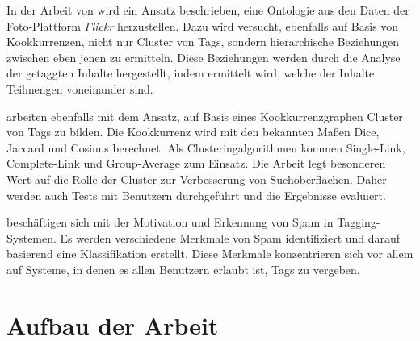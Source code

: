 In der Arbeit von \textcite{ps2006} wird ein Ansatz beschrieben, eine Ontologie aus den Daten der Foto-Plattform \emph{Flickr} herzustellen. Dazu wird versucht, ebenfalls auf Basis von Kookkurrenzen, nicht nur Cluster von Tags, sondern hierarchische Beziehungen zwischen eben jenen zu ermitteln. Diese Beziehungen werden durch die Analyse der getaggten Inhalte hergestellt, indem ermittelt wird, welche der Inhalte Teilmengen voneinander sind.

\textcite{kss2010} arbeiten ebenfalls mit dem Ansatz, auf Basis eines Kookkurrenzgraphen Cluster von Tags zu bilden. Die Kookkurrenz wird mit den bekannten Maßen Dice, Jaccard und Cosinus berechnet. Als Clusteringalgorithmen kommen Single-Link, Complete-Link und Group-Average zum Einsatz. Die Arbeit legt besonderen Wert auf die Rolle der Cluster zur Verbesserung von Suchoberflächen. Daher werden auch Tests mit Benutzern durchgeführt und die Ergebnisse evaluiert.

\textcite{mcf2009} beschäftigen sich mit der Motivation und Erkennung von Spam in Tagging-Systemen. Es werden verschiedene Merkmale von Spam identifiziert und darauf basierend eine Klassifikation erstellt. Diese Merkmale konzentrieren sich vor allem auf Systeme, in denen es allen Benutzern erlaubt ist, Tags zu vergeben.

\section{Aufbau der Arbeit}